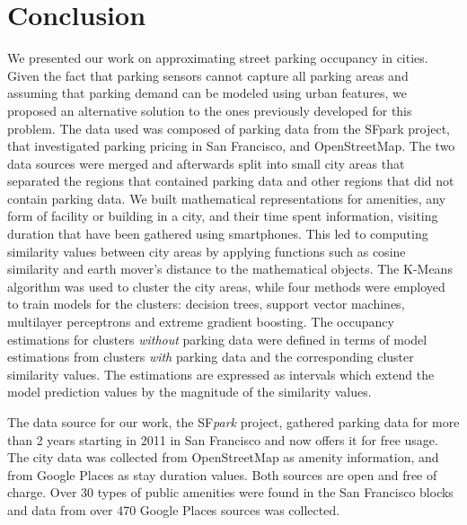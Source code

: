 	\section{Conclusion}
	We presented our work on approximating street parking occupancy in cities.
	Given the fact that parking sensors cannot capture all parking areas and assuming that parking demand can be modeled using urban features, we proposed an alternative solution to the ones previously developed for this problem.
	The data used was composed of parking data from the SFpark project, that investigated parking pricing in San Francisco, and OpenStreetMap. The two data sources were merged and afterwards split into small city areas that separated the regions that contained parking data and other regions that did not contain parking data.
	We built mathematical representations for amenities, any form of facility or building in a city, and their time spent information, visiting duration that have been gathered using smartphones. This led to computing similarity values between city areas by applying functions such as cosine similarity and earth mover's distance to the mathematical objects.
	The K-Means algorithm was used to cluster the city areas, while four methods were employed to train models for the clusters: decision trees, support vector machines, multilayer perceptrons and extreme gradient boosting.
	The occupancy estimations for clusters \textit{without} parking data were defined in terms of model estimations from clusters \textit{with} parking data and the corresponding cluster similarity values.
	The estimations are expressed as intervals which extend the model prediction values by the magnitude of the similarity values. 
	
	The data source for our work, the SF\textit{park} project, gathered parking data for more than 2 years starting in 2011 in San Francisco and now offers it for free usage.
	The city data was collected from OpenStreetMap as amenity information, and from Google Places as stay duration values.
	Both sources are open and free of charge.
	Over 30 types of public amenities were found in the San Francisco blocks and data from over 470 Google Places sources was collected.
	

